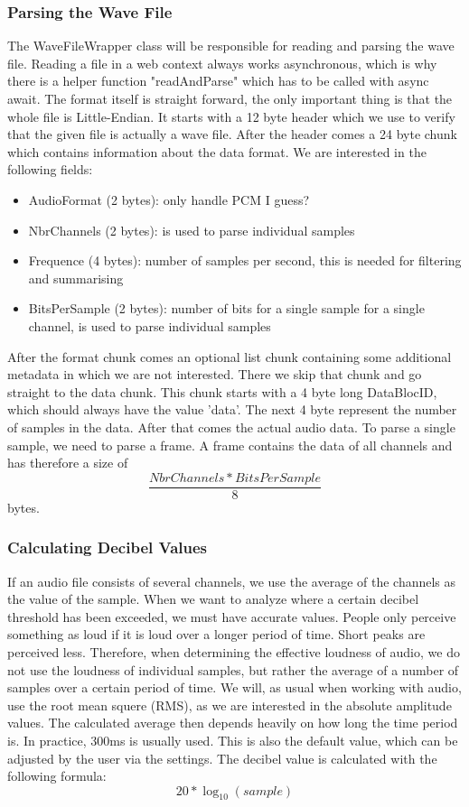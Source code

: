 \subsubsection{Parsing the Wave File}
The WaveFileWrapper class will be responsible for reading and parsing the wave file. Reading a file in a web context always works asynchronous, which is why there is a helper function "readAndParse" which has to be called with async await.
The format itself is straight forward\cite{wav_file_format_wikipedia}, the only important thing is that the whole file is Little-Endian.
It starts with a 12 byte header which we use to verify that the given file is actually a wave file.
After the header comes a 24 byte chunk which contains information about the data format.
We are interested in the following fields:
\begin{itemize}
    \item AudioFormat (2 bytes): only handle PCM I guess?
    \item NbrChannels (2 bytes): is used to parse individual samples
    \item Frequence (4 bytes): number of samples per second, this is needed for filtering and summarising
    \item BitsPerSample (2 bytes): number of bits for a single sample for a single channel, is used to parse individual samples
\end{itemize}
After the format chunk comes an optional list chunk containing some additional metadata in which we are not interested.
There we skip that chunk and go straight to the data chunk.
This chunk starts with a 4 byte long DataBlocID, which should always have the value 'data'.
The next 4 byte represent the number of samples in the data.
After that comes the actual audio data.
To parse a single sample, we need to parse a frame.
A frame contains the data of all channels and has therefore a size of \[\frac{NbrChannels * BitsPerSample}{8}\] bytes.

\subsubsection{Calculating Decibel Values}
If an audio file consists of several channels, we use the average of the channels as the value of the sample.
When we want to analyze where a certain decibel threshold has been exceeded, we must have accurate values.
People only perceive something as loud if it is loud over a longer period of time.
Short peaks are perceived less.
Therefore, when determining the effective loudness of audio, we do not use the loudness of individual samples, but rather the average of a number of samples over a certain period of time. We will, as usual when working with audio, use the root mean squere (RMS), as we are interested in the absolute amplitude values.
The calculated average then depends heavily on how long the time period is.
In practice, 300ms is usually used\cite{timespan_for_audio_rms_calculate}.
This is also the default value, which can be adjusted by the user via the settings.
The decibel value is calculated with the following formula\cite{decibel_wikipedia}:
\[20 * \log_{10} (sample)\]


